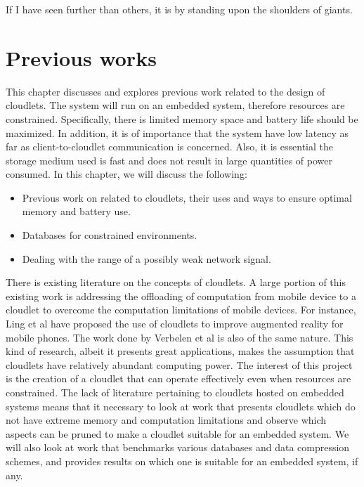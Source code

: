 \begin{savequote}[75mm] 
If I have seen further than others, it is by standing upon the shoulders of giants.
\end{savequote}

\chapter{Previous works}
\label{chaptertwo}

This chapter discusses and explores previous work related to the design of cloudlets. The system will run on an embedded system, therefore resources are constrained. Specifically, there is limited memory space and battery life should be maximized. In addition, it is of importance that the system have low latency as far as client-to-cloudlet communication is concerned. Also, it is essential the storage medium used is fast and does not result in large quantities of power consumed. In this chapter, we
will discuss the following:

	\begin{itemize}
	\itemsep0em
	\item Previous work on related to cloudlets, their uses and ways to ensure optimal memory and battery use.
	\item Databases for constrained environments.
	\item Dealing with the range of a possibly weak network signal.
	\end{itemize}

There is existing literature on the concepts of cloudlets. A large portion of this existing work is addressing the offloading of computation from mobile device to a cloudlet to overcome the computation limitations of mobile devices. For instance, Ling et al\cite{ling2011ar} have proposed the use of cloudlets to improve augmented reality for mobile phones. The work done by Verbelen et al\cite{RefWorks:93} is also of the same nature. This kind of research, albeit it presents great applications, makes the assumption that cloudlets have relatively abundant computing power. The interest of this project is the creation of a cloudlet that can operate effectively even when resources are constrained. The lack of literature pertaining to cloudlets hosted on embedded systems means that it necessary to look at work that presents cloudlets which do not have extreme memory and computation limitations and observe which aspects can be pruned to make a cloudlet suitable for an embedded system. We will also look at work that benchmarks various databases and data compression schemes, and provides results on which one is suitable for an embedded system, if any.

